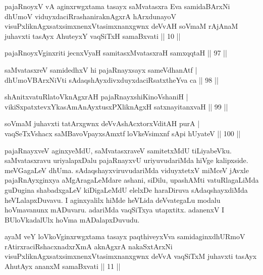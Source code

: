

\begin{shl}
pajaRnoyxV vA aginxrwgxtama tasayx saMvatasxra Eva samidaBArxNi dhUmoV viduyxdaciRrashaniraknAgxrA hArxdunayoV visuPxliknAgxsatxsimxnenxVtasimxnanxgwnx deVvAH soVmaM rAjAnaM juhavxti tasAyx AhuteyxY vaqSiTxH samaBxvati || 10 ||
\end{shl}

\begin{shl}
pajaRnoyxV\s ginxriti jecnxVyaH samitasxMvatasxraH samxqqtaH \hfill|| 97 || 
\end{shl}

\begin{shl}
saMvatasxreV samidedhxV hi pajaRnayxsayx sameVdhanAtf | \\
dhUmoV\s BArxNiVti sAdaqshAyxdivxduyxdaciRsatxtheYva ca \hfill|| 98 || 
\end{shl}

\begin{shl}
shAnitxvatuRlatoV\s knAgxrAH pajaRnayxshiKinoV\s shaniH | \\
vikiSxpatxtevxYkasAmAnAyxtusxPXliknAgxH satxnayitanxvaH \hfill|| 99 || 
\end{shl}

\begin{shl}
soVmaM juhavxti tatArxgwnx deVvAshAcxtorxVditAH purA | \\
vaqSeTxVshacx saMBavoV\s payxsAmxtf loVkeV\s simxnf sApi hUyateV \hfill|| 100 || 
\end{shl}

\begin{artha}
pajaRnayxveV aginxyeMdU, saMvatasxraveV samitetxMdU tiLiyabeVku. 
saMvatasxravu uriyalapxDalu pajaRnayxvU uriyuvudariMda hiVge 
kalipxside. meVGagaLeV dhUma. sAdaqshayxviruvudariMda viduyxtetxV 
miMceV jAvxle pajaRnAyxginxya aMgAragaLeMdare ashani, siDilu, 
upashAMti vatuRlagaLiMda guDugina shabadxgaLeV kiDigaLeMdU elelxDe 
haraDiruva sAdaqshayxdiMda heVLalapxDuvavu. I aginxyalilx hiMde 
heVLida deVvategaLu modalu hoVmavanunx mADuvaru. adariMda vaqSiTxya 
utapxtitx. adanenxV I BUloVkadalUlx hoVma mADalapxDuvudu.
\end{artha}





\begin{shl}
ayaM veY loVkoV\s ginxrwgxtama tasayx paqthiveyxVva samidaginxdhURmoV rAtirxraciRshacxnadxrXmA aknAgxrA nakaSxtArxNi visuPxliknAgxsatxsimxnenxVtasimxnanxgwnx deVvA vaqSiTxM juhavxti tasAyx AhutAyx ananxM samaBxvati || 11 ||
\end{shl}

